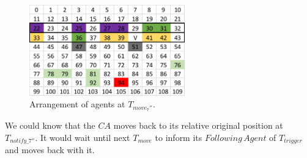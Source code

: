 \begin{figure}[H]
  \centering  
  \includegraphics[width=0.6\textwidth]{figures/T94.png}
  \caption{Arrangement of agents at $T_{move_7''}$. }\label{fig:T94}
\end{figure}

We could know that the $CA$ moves back to its relative original position at $T_{notify\_7''}$. It would wait until next $T_{move}$ to inform its $Following\,Agent$ of $T_{trigger}$ and moves back with it.


